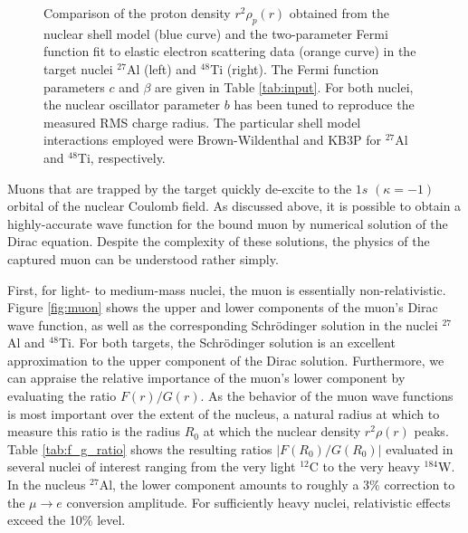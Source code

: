 \documentclass[12pt,letterpaper]{book}
\begin{document}
\begin{figure}
\centering
{}
\caption{Comparison of the proton density $r^2\rho_p(r)$ obtained from the nuclear shell model (blue curve) and the two-parameter Fermi function fit to elastic electron scattering data (orange curve) in the target nuclei $^{27}$Al (left) and $^{48}$Ti (right). The Fermi function parameters $c$ and $\beta$ are given in Table \ref{tab:input}. For both nuclei, the nuclear oscillator parameter $b$ has been tuned to reproduce the measured RMS charge radius. The particular shell model interactions employed were Brown-Wildenthal and KB3P for $^{27}$Al and $^{48}$Ti, respectively.}
\end{figure}

Muons that are trapped by the target quickly de-excite to the $1s$ $(\kappa=-1)$ orbital of the nuclear Coulomb field. As discussed above, it is possible to obtain a highly-accurate wave function for the bound muon by numerical solution of the Dirac equation. Despite the complexity of these solutions, the physics of the captured muon can be understood rather simply. 

First, for light- to medium-mass nuclei, the muon is essentially non-relativistic. Figure \ref{fig:muon} shows the upper and lower components of the muon's Dirac wave function, as well as the corresponding Schr\"odinger solution in the nuclei $^{27}$Al and $^{48}$Ti. For both targets, the Schr\"odinger solution is an excellent approximation to the upper component of the Dirac solution. Furthermore, we can appraise the relative importance of the muon's lower component by evaluating the ratio $F(r)/G(r)$. As the behavior of the muon wave functions is most important over the extent of the nucleus, a natural radius at which to measure this ratio is the radius $R_0$ at which the nuclear density $r^2\rho(r)$ peaks. Table \ref{tab:f_g_ratio} shows the resulting ratios $|F(R_0)/G(R_0)|$ evaluated in several nuclei of interest ranging from the very light $^{12}$C to the very heavy $^{184}$W. In the nucleus $^{27}$Al, the lower component amounts to roughly a $3\%$ correction to the $\mu\rightarrow e$ conversion amplitude. For sufficiently heavy nuclei, relativistic effects exceed the 10\% level. 
\end{document}
